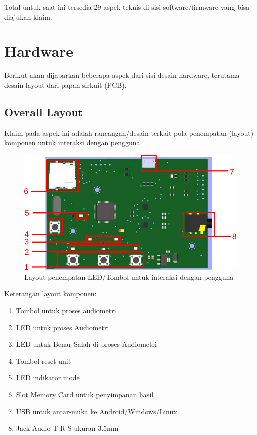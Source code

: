 \documentclass[12pt,]{article}
\begin{document}
	Total untuk saat ini tersedia 29 aspek teknis di sisi software/firmware yang bisa diajukan klaim.

	\newpage
	\section{Hardware}
	Berikut akan dijabarkan beberapa aspek dari sisi desain hardware,
	terutama desain layout dari papan sirkuit (PCB).
	
	\subsection{Overall Layout}
	
	Klaim pada aspek ini adalah rancangan/desain terkait pola penempatan 
	(layout) komponen untuk interaksi dengan pengguna.
	
	\begin{figure}[!ht]
		\centering
		\includegraphics[width=400pt]{images/layout}
		\caption{Layout penempatan LED/Tombol untuk interaksi dengan pengguna}
	\end{figure}

	Keterangan layout komponen:
	\begin{enumerate}
		\item Tombol untuk proses audiometri
		
		\item LED untuk proses Audiometri
		
		\item LED untuk Benar-Salah di proses Audiometri
		
		\item Tombol reset unit
		
		\item LED indikator mode
		
		\item Slot Memory Card untuk penyimpanan hasil
		
		\item USB untuk antar-muka ke Android/Windows/Linux
		
		\item Jack Audio T-R-S ukuran 3.5mm
	\end{enumerate}
\end{document}
